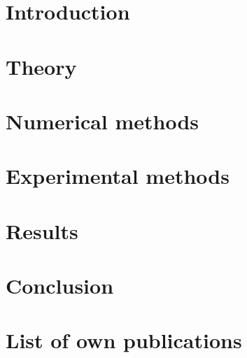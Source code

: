 \documentclass[letterpaper,12pt]{report}
\begin{document}

\tableofcontents

\chapter{Introduction}


\chapter{Theory}


\chapter{Numerical methods}


\chapter{Experimental methods}


\chapter{Results}


\chapter{Conclusion}
%

\label{endtext} 

\printbibliography

\chapter*{List of own publications}

\label{enddocument} 
\end{document}
